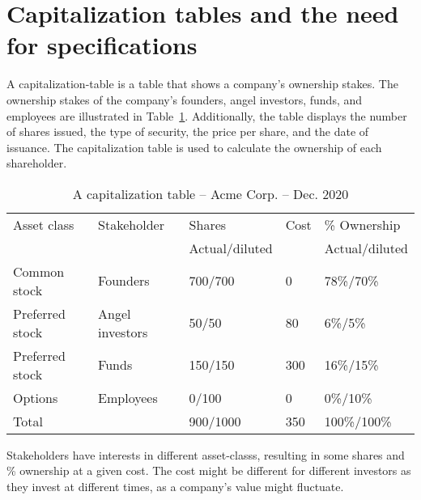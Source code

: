 \section{Capitalization tables and the need for specifications}
\label{ch:cap-tables}
\label{sec:cap-tables}

A \gls{capitalization-table} is a table that shows a company's ownership stakes. The ownership stakes of the company's founders, angel investors, funds, and employees are illustrated in Table~\ref{tab:cap-table}. Additionally, the table displays the number of shares issued, the type of security, the price per share, and the date of issuance. The capitalization table is used to calculate the ownership of each shareholder.

{\small
\begin{table}[!h]
	\centering
	\begin{tabular}{l|l|l|l|l}
		\toprule
		Asset class     & Stakeholder     & Shares                 & Cost  & \% Ownership           \\
		                &                 & \small{Actual/diluted} &       & \small{Actual/diluted} \\ \midrule
		Common stock    & Founders        & 700/700                & 0   & 78\%/70\%              \\ \midrule
		Preferred stock & Angel investors & 50/50                  & 80  & 6\%/5\%                \\ \midrule
		Preferred stock & Funds           & 150/150                & 300 & 16\%/15\%              \\ \midrule
		Options         & Employees       & 0/100                  & 0   & 0\%/10\%               \\ \midrule
		Total           &                 & 900/1000               & 350 & 100\%/100\%            \\ \bottomrule
	\end{tabular}
	\caption{A capitalization table -- Acme Corp. -- Dec. 2020 
     \label{tab:cap-table}}
\end{table}
}

Stakeholders have interests in different \glspl{asset-class}, resulting in some shares and \% ownership at a given cost. The cost might be different for different investors as they invest at different times, as a company's  value might fluctuate.

